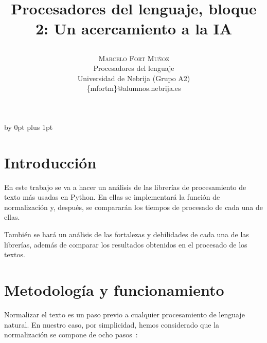 \documentclass[a4paper,twocolumn]{article}
\title{
    \begin{center}
        \huge\bfseries Procesadores del lenguaje, bloque 2: Un acercamiento a la IA
    \end{center}
} %
\author{%
    \begin{center}
        \large\centering\textsc{Marcelo Fort Muñoz} \\[1ex] %
        \normalsize Procesadores del lenguaje \\[0.25ex]
        \normalsize Universidad de Nebrija (Grupo A2) \\[0.25ex] %
        \normalsize \{mfortm\}@alumnos.nebrija.es %
    \end{center}
}
\date{\begin{center}
          \large\today\\[2.5ex]
\end{center}} %
\begin{document}
    \maketitle

    \baselineskip \advance\parskip by 0pt plus 1pt


    \section{Introducción}\label{sec:introduccion}
    En este trabajo se va a hacer un análisis de las librerías de procesamiento de texto más usadas en Python.
    En ellas se implementará la función de normalización y, después, se compararán los tiempos de procesado de cada una de ellas.

    También se hará un análisis de las fortalezas y debilidades de cada una de las librerías,
    además de comparar los resultados obtenidos en el procesado de los textos.


    \section{Metodología y funcionamiento}\label{sec:metodologia-y-funcionamiento}
    Normalizar el texto es un paso previo a cualquier procesamiento de lenguaje natural.
    En nuestro caso, por simplicidad, hemos considerado que la normalización se compone de ocho pasos~\cite{enunciado}:
\end{document}
